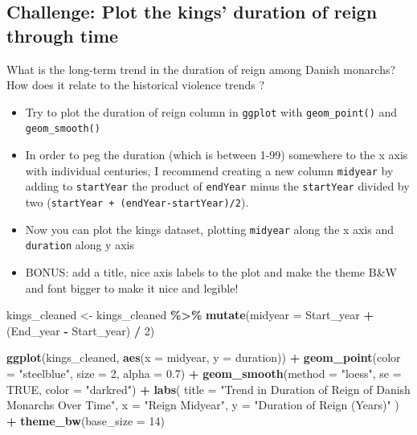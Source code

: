 \documentclass[
]{article}
\newenvironment{Shaded}{\begin{snugshade}}{\end{snugshade}}
\newcommand{\AttributeTok}[1]{\textcolor[rgb]{0.13,0.29,0.53}{#1}}
\newcommand{\ConstantTok}[1]{\textcolor[rgb]{0.56,0.35,0.01}{#1}}
\newcommand{\DecValTok}[1]{\textcolor[rgb]{0.00,0.00,0.81}{#1}}
\newcommand{\FloatTok}[1]{\textcolor[rgb]{0.00,0.00,0.81}{#1}}
\newcommand{\FunctionTok}[1]{\textcolor[rgb]{0.13,0.29,0.53}{\textbf{#1}}}
\newcommand{\NormalTok}[1]{#1}
\newcommand{\OtherTok}[1]{\textcolor[rgb]{0.56,0.35,0.01}{#1}}
\newcommand{\SpecialCharTok}[1]{\textcolor[rgb]{0.81,0.36,0.00}{\textbf{#1}}}
\newcommand{\StringTok}[1]{\textcolor[rgb]{0.31,0.60,0.02}{#1}}
\providecommand{\tightlist}{%
  \setlength{\itemsep}{0pt}\setlength{\parskip}{0pt}}
\begin{document}
\subsection{Challenge: Plot the kings' duration of reign through
time}\label{challenge-plot-the-kings-duration-of-reign-through-time}

What is the long-term trend in the duration of reign among Danish
monarchs? How does it relate to the historical violence trends ?

\begin{itemize}
\tightlist
\item
  Try to plot the duration of reign column in \texttt{ggplot} with
  \texttt{geom\_point()} and \texttt{geom\_smooth()}
\item
  In order to peg the duration (which is between 1-99) somewhere to the
  x axis with individual centuries, I recommend creating a new column
  \texttt{midyear} by adding to \texttt{startYear} the product of
  \texttt{endYear} minus the \texttt{startYear} divided by two
  (\texttt{startYear\ +\ (endYear-startYear)/2}).
\item
  Now you can plot the kings dataset, plotting \texttt{midyear} along
  the x axis and \texttt{duration} along y axis
\item
  BONUS: add a title, nice axis labels to the plot and make the theme
  B\&W and font bigger to make it nice and legible!
\end{itemize}

\begin{Shaded}
\begin{Highlighting}[]
\NormalTok{kings\_cleaned }\OtherTok{\textless{}{-}}\NormalTok{ kings\_cleaned }\SpecialCharTok{\%\textgreater{}\%}
  \FunctionTok{mutate}\NormalTok{(}\AttributeTok{midyear =}\NormalTok{ Start\_year }\SpecialCharTok{+}\NormalTok{ (End\_year }\SpecialCharTok{{-}}\NormalTok{ Start\_year) }\SpecialCharTok{/} \DecValTok{2}\NormalTok{)}

\FunctionTok{ggplot}\NormalTok{(kings\_cleaned, }\FunctionTok{aes}\NormalTok{(}\AttributeTok{x =}\NormalTok{ midyear, }\AttributeTok{y =}\NormalTok{ duration)) }\SpecialCharTok{+}
  \FunctionTok{geom\_point}\NormalTok{(}\AttributeTok{color =} \StringTok{"steelblue"}\NormalTok{, }\AttributeTok{size =} \DecValTok{2}\NormalTok{, }\AttributeTok{alpha =} \FloatTok{0.7}\NormalTok{) }\SpecialCharTok{+}    
  \FunctionTok{geom\_smooth}\NormalTok{(}\AttributeTok{method =} \StringTok{"loess"}\NormalTok{, }\AttributeTok{se =} \ConstantTok{TRUE}\NormalTok{, }\AttributeTok{color =} \StringTok{"darkred"}\NormalTok{) }\SpecialCharTok{+} 
  \FunctionTok{labs}\NormalTok{(}
    \AttributeTok{title =} \StringTok{"Trend in Duration of Reign of Danish Monarchs Over Time"}\NormalTok{,}
    \AttributeTok{x =} \StringTok{"Reign Midyear"}\NormalTok{,}
    \AttributeTok{y =} \StringTok{"Duration of Reign (Years)"}
\NormalTok{  ) }\SpecialCharTok{+}
  \FunctionTok{theme\_bw}\NormalTok{(}\AttributeTok{base\_size =} \DecValTok{14}\NormalTok{)       }
\end{Highlighting}
\end{Shaded}
\end{document}
